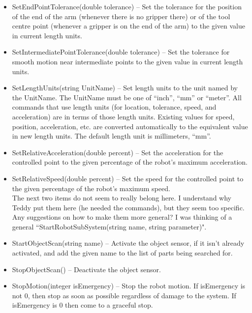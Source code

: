 \begin{itemize}
\item \sf SetEndPointTolerance(double tolerance) \rm -- Set the tolerance
  for the position of the end of the arm (whenever there is no gripper
  there) or of the tool centre point (whenever a gripper is on the end of
  the arm) to the given value in current length units.\\

\item \sf SetIntermediatePointTolerance(double tolerance) \rm -- Set the
  tolerance for smooth motion near intermediate points to the given value
  in current length units.\\

\item \sf SetLengthUnits(string UnitName) \rm -- Set length units to the
  unit named by the \sf UnitName\rm.  The \sf UnitName \rm must be one of
  ``inch'', ``mm'' or ``meter''. All commands that use length units (for
  location, tolerance, speed, and acceleration) are in terms of those
  length units. Existing values for speed, position, acceleration, etc. are
  converted automatically to the equivalent value in new length units. The
  default length unit is millimeters, ``mm''.\\

\item \sf SetRelativeAcceleration(double percent) \rm -- Set the
  acceleration for the controlled point to the given percentage of the
  robot's maximum acceleration.\\

\item \sf SetRelativeSpeed(double percent) \rm -- Set the speed for the
  controlled point to the given percentage of the robot's maximum speed.\\

The next two items do not seem to really belong here. I understand why
Teddy put them here (he needed the commands), but they seem too specific.
Any suggestions on how to make them more general? I was thinking of a
general ``StartRobotSubSystem(string name, string parameter)".
\item \sf StartObjectScan(string name) \rm -- Activate the object sensor,
  if it isn't already activated, and add the given \sf name \rm to the list of
  parts being searched for.\\

\item \sf StopObjectScan() \rm -- Deactivate the object sensor.\\

\item \sf StopMotion(integer isEmergency) \rm -- Stop the robot motion. If
  \sf isEmergency \rm is not 0, then stop as soon as possible regardless of
  damage to the system. If \sf isEmergency \rm is 0 then come to a graceful
  stop.\\

\end{itemize}

